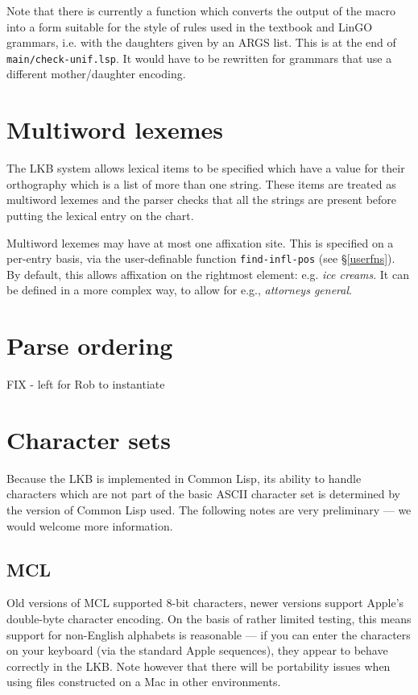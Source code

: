 \documentclass[12pt]{report}
\begin{document}
Note that there is currently a function which converts the 
output of the macro into a form suitable for the style of
rules used in the textbook and LinGO grammars, i.e.
with the daughters given by an {\sc ARGS} list.  This is
at the end of {\tt main/check-unif.lsp}.  It would
have to be rewritten for grammars that use a different
mother/daughter encoding.

\section{Multiword lexemes}
\label{multiword}

The LKB system allows lexical items to be specified which
have a value for their orthography which is a list of 
more than one string.
These items are treated as multiword lexemes and the 
parser checks that all the strings are present before
putting the lexical entry on the chart.

Multiword lexemes may have at most one affixation site.
This is specified on a per-entry basis, via the
user-definable function {\tt find-infl-pos} (see \S\ref{userfns}).
By default, this allows affixation on the rightmost element:
e.g. {\it ice creams}.  It can be defined in a more complex
way, to allow for e.g., {\it attorneys general}.

\section{Parse ordering}
\label{first-only}

FIX - left for Rob to instantiate 

\section{Character sets}
\label{accents}

Because the LKB is implemented in Common Lisp, its ability 
to handle characters
which are not part of the basic ASCII character set is determined by the
version of Common Lisp used.  The following notes are very preliminary --- we
would welcome more information.

\subsection{MCL}

Old versions of MCL supported 8-bit characters, newer versions support Apple's
double-byte character encoding.  On the basis of rather limited testing, this
means support for non-English alphabets is reasonable --- if you can enter the
characters on your keyboard (via the standard Apple sequences), they appear to
behave correctly in the LKB.  Note however that there will be portability 
issues when using files constructed on a Mac in other environments.
\end{document}
